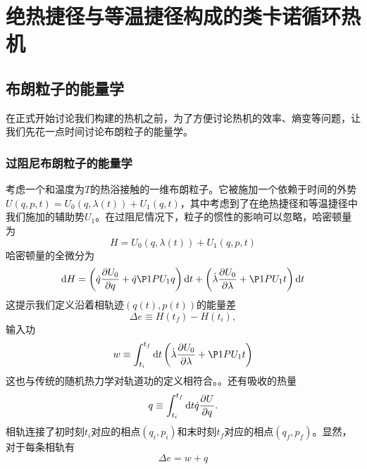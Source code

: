 \chapter{绝热捷径与等温捷径构成的类卡诺循环热机}
\section{布朗粒子的能量学}
\qquad 在正式开始讨论我们构建的热机之前，为了方便讨论热机的效率、熵变等问题，让我们先花一点时间讨论布朗粒子的能量学。
\subsection{过阻尼布朗粒子的能量学}

考虑一个和温度为$T$的热浴接触的一维布朗粒子。它被施加一个依赖于时间的外势$U(q,p,t) = U_0 (q,\lambda(t)) + U_1 (q,t)$，其中考虑到了在绝热捷径和等温捷径中我们施加的辅助势$U_1$。在过阻尼情况下，粒子的惯性的影响可以忽略，哈密顿量为
\begin{equation}
    H=U_0 (q,\lambda(t)) + U_1 (q,p,t)
    \label{eq31.1}
\end{equation}
哈密顿量的全微分为
\begin{equation}
    \M{d} H=\left(\dot{q} \frac{\partial U_0}{\partial q} + \dot{q} \P1P{U_1}{q}  \right) \M{d} t+\left(\dot{\lambda} \frac{\partial U_0}{\partial \lambda} + \P1P{U_1}{t} \right) \M{d} t
    \label{eq31.2}
\end{equation}
这提示我们定义沿着相轨迹$(q(t), p(t))$的能量差\cite{Tu2013}
\begin{equation}
     \Delta e \equiv H\left(t_{f}\right)-H\left(t_{i}\right),
     \label{eq31.3}
\end{equation}
输入功
\begin{equation}
    w \equiv \int_{t_{i}}^{t_{f}} \M{d} t \left( \dot{\lambda} \frac{\partial U_0}{\partial \lambda} + \P1P{U_1}{t} \right)
    \label{eq31.4}
\end{equation}
这也与传统的随机热力学对轨道功的定义相符合。\cite{Sekimoto2010,Jarzynski1997,Sekimoto_1997}。还有吸收的热量
\begin{equation}
    q \equiv \int_{t_{i}}^{t_{f}} \mathrm{d} t \dot{q} \frac{\partial U}{\partial q} .
    \label{eq31.5}
\end{equation}
相轨连接了初时刻$t_i$对应的相点$(q_i , p_i )$和末时刻$t_f$对应的相点$(q_f , p_f )$。显然，对于每条相轨有
\begin{equation}
    \Delta e = w + q
    \label{eq31.6}
\end{equation}

